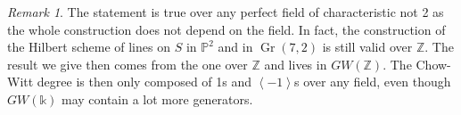 \documentclass{amsart}
\theoremstyle{plain}%
\theoremstyle{remark}
\newtheorem{rmq}[subsubsection]{Remark}
\theoremstyle{definition}
\newcommand{\ek}{\mathbb{k}}
\newcommand{\eP}{\mathbb{P}}
\newcommand{\eZ}{\mathbb{Z}}
\newcommand{\GW}{GW}
\newcommand{\qscal}[1]{\left\langle #1 \right\rangle}
\newcommand{\Grass}{\operatorname{Gr}}
\begin{document}
\begin{rmq}
The statement is true over any perfect field of characteristic not 2 as the whole construction does not depend on the field. In fact, the construction of the Hilbert scheme of lines on $S$ in $\eP^2$ and in $\Grass(7,2)$ is still valid over $\eZ.$ The result we give then comes from the one over $\eZ$ and lives in $\GW(\eZ)$. The Chow-Witt degree is then only composed of 1s and $\qscal{-1}$s over any field, even though $\GW(\ek)$ may contain a lot more generators.
\end{rmq}





























\end{document}
